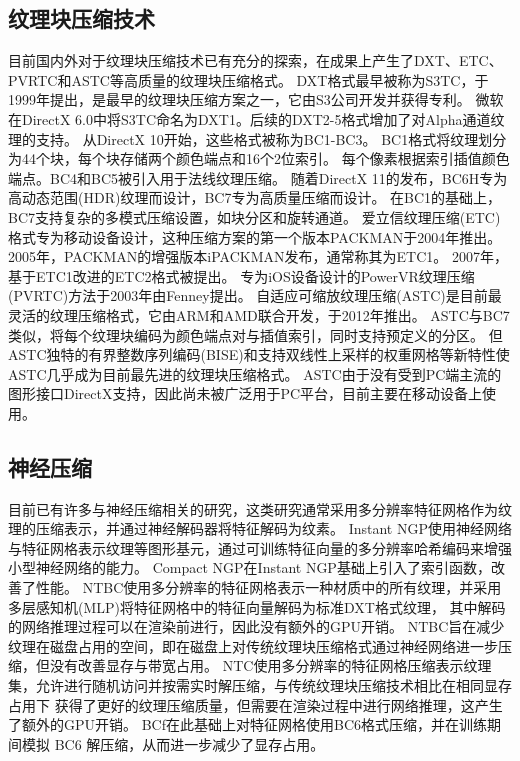 \subsection{纹理块压缩技术}
目前国内外对于纹理块压缩技术已有充分的探索，在成果上产生了DXT、ETC、PVRTC和ASTC等高质量的纹理块压缩格式。
DXT格式最早被称为S3TC\cite{iourcha1999system}，于1999年提出，是最早的纹理块压缩方案之一，它由S3公司开发并获得专利。
微软在DirectX 6.0中将S3TC命名为DXT1。后续的DXT2-5格式增加了对Alpha通道纹理的支持。
从DirectX 10开始，这些格式被称为BC1-BC3。
BC1格式将纹理划分为4\times4个块，每个块存储两个颜色端点和16个2位索引。
每个像素根据索引插值颜色端点。BC4和BC5被引入用于法线纹理压缩。
随着DirectX 11的发布，BC6H专为高动态范围(HDR)纹理而设计，BC7专为高质量压缩而设计。
在BC1的基础上，BC7支持复杂的多模式压缩设置，如块分区和旋转通道。
爱立信纹理压缩(ETC)格式专为移动设备设计，这种压缩方案的第一个版本PACKMAN\cite{strom2004packman}于2004年推出。
2005年，PACKMAN的增强版本iPACKMAN\cite{strom2005packman}发布，通常称其为ETC1。
2007年，基于ETC1改进的ETC2\cite{strom2007etc}格式被提出。
专为iOS设备设计的PowerVR纹理压缩(PVRTC)方法于2003年由Fenney\cite{fenney2003texture}提出。
自适应可缩放纹理压缩(ASTC)\cite{nystad2012adaptive}是目前最灵活的纹理压缩格式，它由ARM和AMD联合开发，于2012年推出。
ASTC与BC7类似，将每个纹理块编码为颜色端点对与插值索引，同时支持预定义的分区。
但ASTC独特的有界整数序列编码(BISE)和支持双线性上采样的权重网格等新特性使ASTC几乎成为目前最先进的纹理块压缩格式。
ASTC由于没有受到PC端主流的图形接口DirectX支持，因此尚未被广泛用于PC平台，目前主要在移动设备上使用\cite{vaidyanathan2023random}。

\subsection{神经压缩}

目前已有许多与神经压缩相关的研究，这类研究通常采用多分辨率特征网格作为纹理的压缩表示，并通过神经解码器将特征解码为纹素。
Instant NGP\cite{muller2022instant}使用神经网络与特征网格表示纹理等图形基元，通过可训练特征向量的多分辨率哈希编码来增强小型神经网络的能力。
Compact NGP\cite{takikawa2023compact}在Instant NGP基础上引入了索引函数，改善了性能。
NTBC\cite{fujieda2024neural}使用多分辨率的特征网格表示一种材质中的所有纹理，并采用多层感知机(MLP)将特征网格中的特征向量解码为标准DXT格式纹理，
其中解码的网络推理过程可以在渲染前进行，因此没有额外的GPU开销。
NTBC旨在减少纹理在磁盘占用的空间，即在磁盘上对传统纹理块压缩格式通过神经网络进一步压缩，但没有改善显存与带宽占用。
NTC\cite{vaidyanathan2023random}使用多分辨率的特征网格压缩表示纹理集，允许进行随机访问并按需实时解压缩，与传统纹理块压缩技术相比在相同显存占用下
获得了更好的纹理压缩质量，但需要在渲染过程中进行网络推理，这产生了额外的GPU开销。
BCf\cite{weinreich2024real}在此基础上对特征网格使用BC6格式压缩，并在训练期间模拟 BC6 解压缩，从而进一步减少了显存占用。

